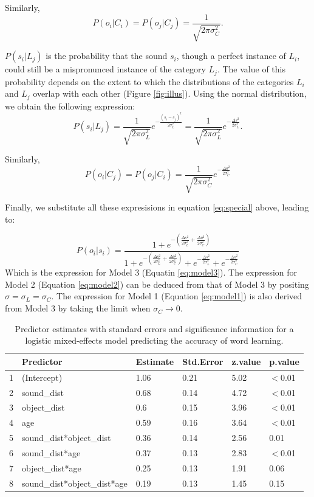 \documentclass[english,,man]{apa6}
\begin{document}
Similarly, \[P(o_i | C_i) = P(o_j | C_j) = \frac{1}{\sqrt{2\pi\sigma^2_C}}.\]

\(P(s_i | L_j)\) is the probability that the sound \(s_i\), though a perfect instance of \(L_i\), could still be a mispronunced instance of the category \(L_j\). The value of this probability depends on the extent to which the distributions of the categories \(L_i\) and \(L_j\) overlap with each other (Figure \ref{fig:illus}). Using the normal distribution, we obtain the following expression: \[P(s_i| L_j) = \frac{1}{\sqrt{2\pi\sigma^2_L}} e^{-\frac{(s_i-s_j)^2}{2\sigma^2_L}} = \frac{1}{\sqrt{2\pi\sigma^2_L}} e^{-\frac{\Delta s^2}{2\sigma^2_L}}.\]

Similarly, \[P(o_i| C_j) = P(o_j| C_i) = \frac{1}{\sqrt{2\pi\sigma^2_C}} e^{-\frac{\Delta o^2}{2\sigma^2_C}} \]

Finally, we substitute all these expresisions in equation \ref{eq:special} above, leading to:

\[P(o_i|s_i)= \frac{1 + e^{- (\frac{\Delta s^2}{2\sigma_L^2}+ \frac{\Delta o^2}{2\sigma_C^2})}}{1 + e^{-(\frac{\Delta s^2}{2\sigma_L^2}+ \frac{\Delta o^2}{2\sigma_C^2})}+ e^{-\frac{\Delta s^2}{2\sigma_L^2}} + e^{-\frac{\Delta o^2}{2\sigma_C^2}}}\]
Which is the expression for Model 3 (Equatin \ref{eq:model3}). The expression for Model 2 (Equation \ref{eq:model2}) can be deduced from that of Model 3 by positing \(\sigma= \sigma_L = \sigma_C\). The expression for Model 1 (Equation \ref{eq:model1}) is also derived from Model 3 by taking the limit when \(\sigma_C \rightarrow 0\).

\vspace{1em}

 \vspace{1em}

\begin{table}[ht]
\centering
\begin{tabular}{rlllll}
  \hline
 & Predictor & Estimate & Std.Error & z.value & p.value \\ 
  \hline
1 & (Intercept) & 1.06 & 0.21 & 5.02 & $<$0.01 \\ 
  2 & sound\_dist & 0.68 & 0.14 & 4.72 & $<$0.01 \\ 
  3 & object\_dist & 0.6 & 0.15 & 3.96 & $<$0.01 \\ 
  4 & age & 0.59 & 0.16 & 3.64 & $<$0.01 \\ 
  5 & sound\_dist*object\_dist & 0.36 & 0.14 & 2.56 & 0.01 \\ 
  6 & sound\_dist*age & 0.37 & 0.13 & 2.83 & $<$0.01 \\ 
  7 & object\_dist*age & 0.25 & 0.13 & 1.91 & 0.06 \\ 
  8 & sound\_dist*object\_dist*age & 0.19 & 0.13 & 1.45 & 0.15 \\ 
   \hline
\end{tabular}
\caption{Predictor estimates with standard errors and significance information for a logistic mixed-effects model predicting the accuracy of word learning.} 
\end{table}
\end{document}
